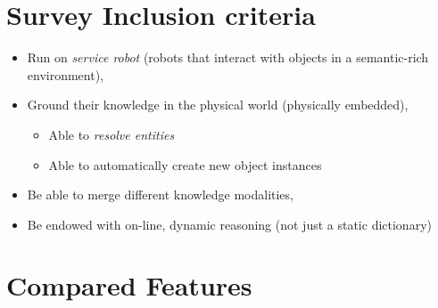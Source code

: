 \documentclass[a4paper]{article}
\begin{document}
\section{Survey Inclusion criteria}

\begin{itemize}
\item  Run on \emph{service robot} (robots that interact with objects in a
semantic-rich environment),

\item  Ground their knowledge in the physical world (physically embedded),
\begin{itemize}
\item  Able to \emph{resolve entities}
\item  Able to automatically create new object instances
\end{itemize}

\item  Be able to merge different knowledge modalities,
\item  Be endowed with on-line, dynamic reasoning (not just a static
		dictionary)

\end{itemize}


\section{Compared Features}
\end{document}
